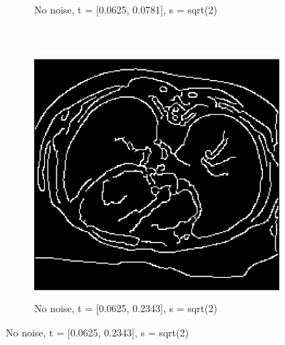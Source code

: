 \begin{figure}[H]
\begin{subfigure}{.5\textwidth}
    \caption{No noise, t = [0.0625, 0.0781], s = sqrt(2)}
    \label{fig:cany_no_noise}
  \end{subfigure}\\%
  \begin{subfigure}{.5\textwidth}
    \centering
    \includegraphics[width=.9\textwidth]{./canny1/no_noise_t_00625_02343}
    \caption{No noise, t = [0.0625, 0.2343], s = sqrt(2)}
    \label{fig:cany_no_noise}
  \end{subfigure}%
  
\end{figure}